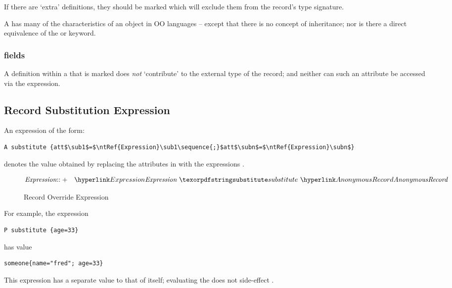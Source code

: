 \begin{aside}
If there are `extra' definitions, they should be marked  which will exclude them from the record's type signature.
\end{aside}

\begin{aside}
A  has many of the characteristics of an object in OO languages -- except that there is no concept of inheritance; nor is there a direct equivalence of the  or  keyword.
\end{aside}

\subsubsection{ fields}
\label{privateField}
A definition within a  that is marked  does \emph{not} `contribute' to the external type of the record; and neither can such an attribute be accessed via the  expression. 

\subsection{Record Substitution Expression}
\label{recordOverride}
An expression of the form:
\begin{lstlisting}[mathescape=true]
A substitute {att$\sub1$=$\ntRef{Expression}\sub1\sequence{;}$att$\subn$=$\ntRef{Expression}\subn$}
\end{lstlisting}
denotes the value obtained by replacing the attributes \subi{} in  with the expressions \subi.

\begin{figure}[htbp]
\begin{eqnarray*}
\emph{Expression}&\arrowplus&\ntRef{Expression}\ \q{substitute}\ \ntRef{AnonymousRecord}
\end{eqnarray*}
\caption{Record Override Expression}\label{recordOverrideFig}
\end{figure}

For example, the expression
\begin{lstlisting}
P substitute {age=33}
\end{lstlisting}
has value
\begin{lstlisting}
someone{name="fred"; age=33}
\end{lstlisting}
\begin{aside}
This expression has a separate value to that of  itself; evaluating the  does not side-effect .
\end{aside}

